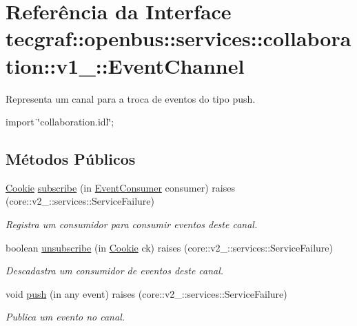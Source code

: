 \hypertarget{interfacetecgraf_1_1openbus_1_1services_1_1collaboration_1_1v1__0_1_1EventChannel}{\section{\-Referência da \-Interface tecgraf\-:\-:openbus\-:\-:services\-:\-:collaboration\-:\-:v1\-\_\-:\-:\-Event\-Channel}
\label{interfacetecgraf_1_1openbus_1_1services_1_1collaboration_1_1v1__0_1_1EventChannel}
}


\-Representa um canal para a troca de eventos do tipo push.  




{\ttfamily import \char`\"{}collaboration.\-idl\char`\"{};}

\subsection*{\-Métodos \-Públicos}
\begin{DoxyCompactItemize}
\item 
\hyperlink{namespacetecgraf_1_1openbus_1_1services_1_1collaboration_1_1v1__0_a0ae94dd917c8ec58f4a7fcc2087064be}{\-Cookie} \hyperlink{interfacetecgraf_1_1openbus_1_1services_1_1collaboration_1_1v1__0_1_1EventChannel_a9888317685ae264eb0900e50860d771b}{subscribe} (in \hyperlink{interfacetecgraf_1_1openbus_1_1services_1_1collaboration_1_1v1__0_1_1EventConsumer}{\-Event\-Consumer} consumer)  raises (core\-::v2\-\_\-::services\-::\-Service\-Failure)
\begin{DoxyCompactList}\small\item\em \-Registra um consumidor para consumir eventos deste canal. \end{DoxyCompactList}\item 
boolean \hyperlink{interfacetecgraf_1_1openbus_1_1services_1_1collaboration_1_1v1__0_1_1EventChannel_a83aa4eefecacc727331f2d0742472db7}{unsubscribe} (in \hyperlink{namespacetecgraf_1_1openbus_1_1services_1_1collaboration_1_1v1__0_a0ae94dd917c8ec58f4a7fcc2087064be}{\-Cookie} ck)  raises (core\-::v2\-\_\-::services\-::\-Service\-Failure)
\begin{DoxyCompactList}\small\item\em \-Descadastra um consumidor de eventos deste canal. \end{DoxyCompactList}\item 
void \hyperlink{interfacetecgraf_1_1openbus_1_1services_1_1collaboration_1_1v1__0_1_1EventChannel_ae27a98e43262d4e06387526f55bd3b04}{push} (in any event)  raises (core\-::v2\-\_\-::services\-::\-Service\-Failure)
\begin{DoxyCompactList}\small\item\em \-Publica um evento no canal. \end{DoxyCompactList}\end{DoxyCompactItemize}


